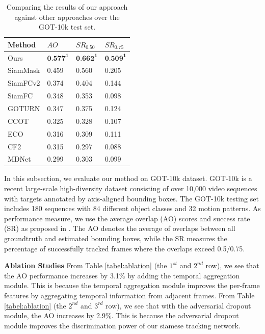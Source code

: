 \documentclass{article}
\begin{document}
\begin{table}
\centering
\caption{Comparing the results of our approach against other approaches over the GOT-10k test set.}
\begin{tabular}{l l l l}
\bottomrule
Method   &  $AO$   &  $SR_{0.50}$ & $SR_{0.75}$  \\
\hline
Ours &  $\textbf{0.577}^\textbf{1}$ & $\textbf{0.662}^\textbf{1}$  & $\textbf{0.509}^\textbf{1}$  \\
SiamMask &  0.459&  0.560 &0.205 \\
SiamFCv2 &  0.374&  0.404 &0.144 \\
SiamFC   &  0.348&  0.353 &0.098 \\
GOTURN	 &  0.347&  0.375 &0.124 \\
CCOT	 &  0.325&  0.328 &0.107 \\
ECO	     &  0.316&  0.309 &0.111 \\
CF2	     &  0.315&  0.297 &0.088 \\
MDNet	 &  0.299&  0.303 &0.099 \\
\bottomrule
\end{tabular}
\label{table:got}
\end{table}
In this subsection, we evaluate our method on GOT-10k \cite{Huang_2019} dataset.
GOT-10k is a recent large-scale high-diversity dataset consisting of over 10,000 video sequences with targets annotated by axis-aligned bounding boxes. 
The GOT-10k testing set includes 180 sequences with 84 different object classes and 32 motion patterns. As performance measure, we use the average overlap (AO) scores and success rate (SR) as proposed in \cite{Huang_2019}. The AO denotes the average of overlaps between all groundtruth and estimated bounding boxes, while the SR measures the percentage of successfully tracked frames where the overlaps exceed 0.5/0.75.

\textbf{Ablation Studies}
From Table \ref{tabel:ablation} (the $1^{st}$ and $2^{nd}$ row), we see that the AO performance increases by 3.1\% by adding the temporal aggregation module.
This is because the temporal aggregation module improves the per-frame features by aggregating temporal information from adjacent frames.
From Table \ref{tabel:ablation} (the $2^{nd}$ and $3^{rd}$ row), we see that with the adversarial dropout module, the AO increases by 2.9\%.
This is because the adversarial dropout module improves the discrimination power of our siamese tracking network.
\end{document}
